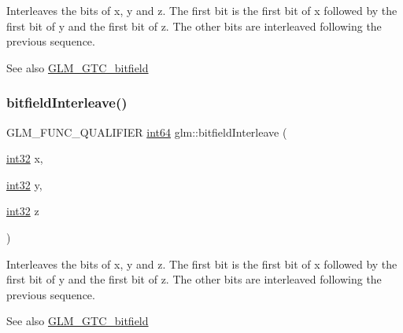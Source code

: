 Interleaves the bits of x, y and z. The first bit is the first bit of x followed by the first bit of y and the first bit of z. The other bits are interleaved following the previous sequence.

\begin{DoxySeeAlso}{See also}
\hyperlink{group__gtc__bitfield}{G\+L\+M\+\_\+\+G\+T\+C\+\_\+bitfield} 
\end{DoxySeeAlso}
\mbox{\label{group__gtc__bitfield_ga64e2d84f6560af3cc639644b1e628c42}} 
\subsubsection{\texorpdfstring{bitfield\+Interleave()}{bitfieldInterleave()}\hspace{0.1cm}{\footnotesize\ttfamily [11/16]}}
{\footnotesize\ttfamily G\+L\+M\+\_\+\+F\+U\+N\+C\+\_\+\+Q\+U\+A\+L\+I\+F\+I\+ER \hyperlink{group__gtc__type__precision_ga435d75819cce297cc5fa21bd84ef89a5}{int64} glm\+::bitfield\+Interleave (\begin{DoxyParamCaption}\item[{\hyperlink{group__gtc__type__precision_ga632d8b25f6b61659f39ea4321fab92a4}{int32}}]{x,  }\item[{\hyperlink{group__gtc__type__precision_ga632d8b25f6b61659f39ea4321fab92a4}{int32}}]{y,  }\item[{\hyperlink{group__gtc__type__precision_ga632d8b25f6b61659f39ea4321fab92a4}{int32}}]{z }\end{DoxyParamCaption})}

Interleaves the bits of x, y and z. The first bit is the first bit of x followed by the first bit of y and the first bit of z. The other bits are interleaved following the previous sequence.

\begin{DoxySeeAlso}{See also}
\hyperlink{group__gtc__bitfield}{G\+L\+M\+\_\+\+G\+T\+C\+\_\+bitfield} 
\end{DoxySeeAlso}
\mbox{\label{group__gtc__bitfield_ga7c10eb37f608365cfaef5ca2c476e1ce}} 
